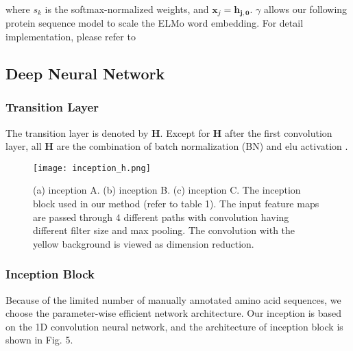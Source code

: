 \documentclass{article}
\begin{document}
        where $s_{k}$ is the softmax-normalized weights, and $\mathbf{x}_{j} = \mathbf{h_{j, 0}}$. $\gamma$ allows our following protein sequence model to scale the ELMo word embedding. For detail implementation, please refer to \citep{Peters:2018}

    \subsection{Deep Neural Network}
        \subsubsection{Transition Layer}
            The transition layer is denoted by \textbf{H}. Except for \textbf{H} after the first convolution layer, all \textbf{H} are the combination of batch normalization (BN) \citep{Ioffe2015BatchNA} and elu activation \citep{DBLP:journals/corr/ClevertUH15}.
        
            \iffalse
            \begin{minipage}[c]{0.75\textwidth}
            \texttt{[image: inception-a.png]}
            \texttt{[image: inception-b.png]}
            \texttt{[image: inception-c.png]}
            
            \end{minipage}
            \fi
        
            \begin{figure}[h]
            	\texttt{[image: inception\_h.png]}
            	\centering
            	\caption{(a) inception A. (b) inception B. (c) inception C. The inception block used in our method (refer to table 1). The input feature maps are passed through 4 different paths with convolution having different filter size and max pooling. The convolution with the yellow background is viewed as dimension reduction.}
            \end{figure}

        \subsubsection{Inception Block}
            Because of the limited number of manually annotated amino acid sequences, we choose the parameter-wise efficient network architecture.
            Our inception is based on the 1D convolution neural network, and the architecture of inception block is shown in Fig. 5. 
\end{document}
